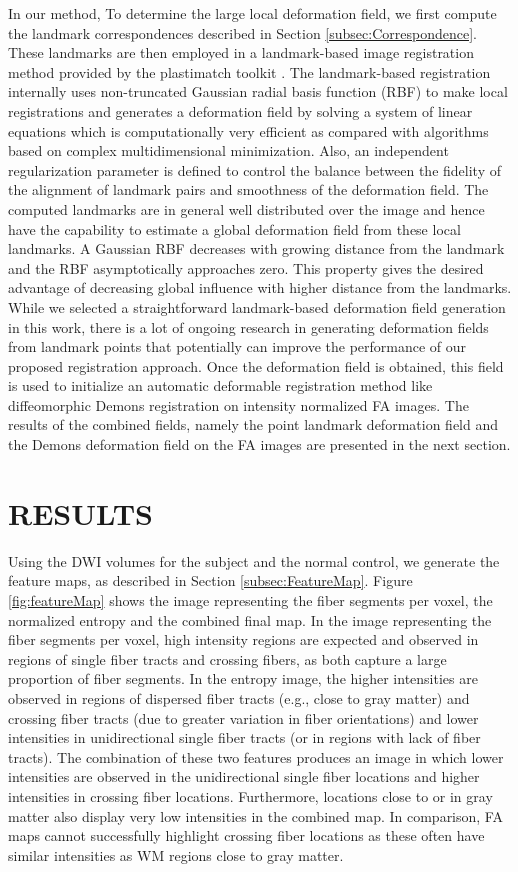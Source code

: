 \documentclass{llncs}
\begin{document}
In our method, To determine the large local deformation field, we first compute the landmark correspondences described in Section \ref{subsec:Correspondence}. These landmarks are then employed in a landmark-based image registration method provided by the plastimatch toolkit \cite{Sharp10}. The landmark-based registration internally uses non-truncated Gaussian radial basis function (RBF) to make local registrations and generates a deformation field by solving a system of linear equations which is computationally very efficient as compared with algorithms based on complex multidimensional minimization. Also, an independent regularization parameter is defined to control the balance between the fidelity of the alignment of landmark pairs and smoothness of the deformation field. The computed landmarks are in general well distributed over the image and hence have the capability to estimate a global deformation field from these  local landmarks. A Gaussian RBF decreases with growing distance from the landmark and the RBF asymptotically approaches zero. This property gives the desired advantage of decreasing global influence with higher distance from the landmarks. While we selected a straightforward landmark-based deformation field generation in this work, there is a lot of ongoing research in generating deformation fields from landmark points that potentially can improve the performance of our proposed registration approach. Once the deformation field is obtained, this field is used to initialize an automatic deformable registration method like diffeomorphic Demons registration on intensity normalized FA images. The results of the combined fields, namely the point landmark deformation field and the Demons deformation field on the FA images are presented in the next section.

\section{RESULTS}
Using the DWI volumes for the subject and the normal control, we generate the feature maps, as described in Section \ref{subsec:FeatureMap}. Figure \ref{fig:featureMap} shows the image representing the fiber segments per voxel, the normalized entropy and the combined final map. In the image representing the fiber segments per voxel,  high intensity regions are expected and observed in regions of single fiber tracts and crossing fibers, as both capture a large proportion of fiber segments. In the entropy image, the higher intensities are observed in regions of dispersed fiber tracts (e.g., close to gray matter) and crossing fiber tracts (due to greater variation in fiber orientations) and lower intensities in unidirectional single fiber tracts (or in regions with lack of fiber tracts). The combination of  these two features produces an image in which lower intensities are observed in the unidirectional single fiber locations and higher intensities in crossing fiber locations. Furthermore, locations close to or in gray matter also display very low intensities in the combined map.  In comparison, FA maps cannot successfully highlight crossing fiber locations as these often have similar intensities as WM regions close to gray matter.
\end{document}
